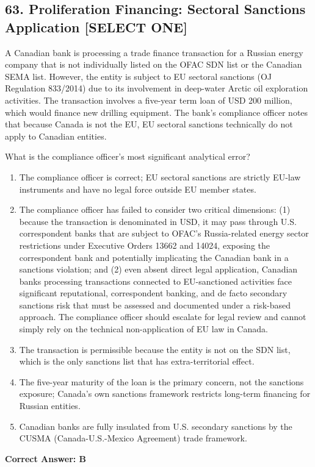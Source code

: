 \documentclass[11pt,a4paper]{article}
\begin{document}
	\subsection{63. Proliferation Financing: Sectoral Sanctions Application \textnormal{[SELECT ONE]}}
	
	A Canadian bank is processing a trade finance transaction for a Russian energy company that is not individually listed on the OFAC SDN list or the Canadian SEMA list. However, the entity is subject to EU sectoral sanctions (OJ Regulation 833/2014) due to its involvement in deep-water Arctic oil exploration activities. The transaction involves a five-year term loan of USD 200 million, which would finance new drilling equipment. The bank's compliance officer notes that because Canada is not the EU, EU sectoral sanctions technically do not apply to Canadian entities.
	
	What is the compliance officer's most significant analytical error?
	
	\begin{enumerate}[label=\Alph*.]
		\item The compliance officer is correct; EU sectoral sanctions are strictly EU-law instruments and have no legal force outside EU member states.
		\item The compliance officer has failed to consider two critical dimensions: (1) because the transaction is denominated in USD, it may pass through U.S. correspondent banks that are subject to OFAC's Russia-related energy sector restrictions under Executive Orders 13662 and 14024, exposing the correspondent bank and potentially implicating the Canadian bank in a sanctions violation; and (2) even absent direct legal application, Canadian banks processing transactions connected to EU-sanctioned activities face significant reputational, correspondent banking, and de facto secondary sanctions risk that must be assessed and documented under a risk-based approach. The compliance officer should escalate for legal review and cannot simply rely on the technical non-application of EU law in Canada.
		\item The transaction is permissible because the entity is not on the SDN list, which is the only sanctions list that has extra-territorial effect.
		\item The five-year maturity of the loan is the primary concern, not the sanctions exposure; Canada's own sanctions framework restricts long-term financing for Russian entities.
		\item Canadian banks are fully insulated from U.S. secondary sanctions by the CUSMA (Canada-U.S.-Mexico Agreement) trade framework.
	\end{enumerate}
	\textbf{Correct Answer: B}
	
\end{document}
